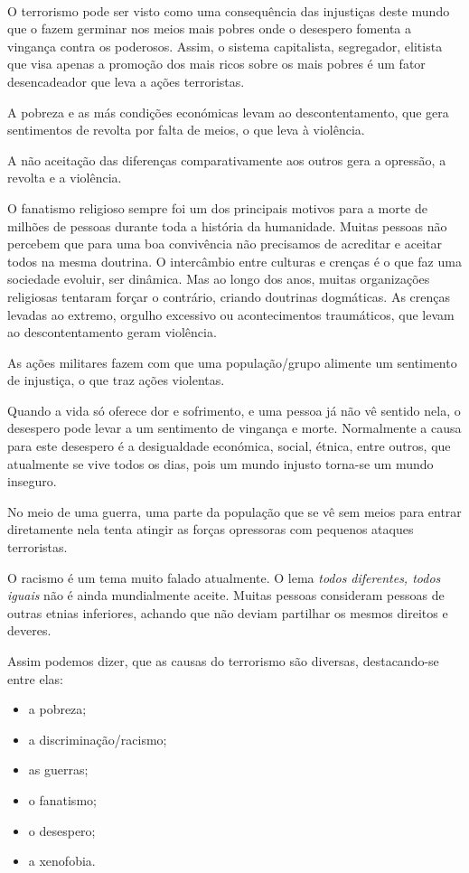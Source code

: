 \documentclass{report}
\begin{document}
\paragraph{} O terrorismo pode ser visto como uma consequência das injustiças deste mundo que o fazem germinar nos meios mais pobres onde o desespero fomenta a vingança contra os poderosos. Assim, o sistema capitalista, segregador, elitista que visa apenas a promoção dos mais ricos sobre os mais pobres é um fator desencadeador que leva a ações terroristas. \par
A pobreza e as más condições económicas levam ao descontentamento, que gera sentimentos de revolta por falta de meios, o que leva à violência. \par
A não aceitação das diferenças comparativamente aos outros gera a opressão, a revolta e a violência.\par
O fanatismo religioso sempre foi um dos principais motivos para a morte de milhões de pessoas durante toda a história da humanidade. Muitas pessoas não percebem que para uma boa convivência não precisamos de acreditar e aceitar todos na mesma doutrina. O intercâmbio entre culturas e crenças é o que faz uma sociedade evoluir, ser dinâmica. Mas ao longo dos anos, muitas organizações religiosas tentaram forçar o contrário, criando doutrinas dogmáticas. As crenças levadas ao extremo, orgulho excessivo ou acontecimentos traumáticos, que levam ao descontentamento geram violência. \par
As ações militares fazem com que uma população/grupo alimente um sentimento de injustiça, o que traz ações violentas.\par
Quando a vida só oferece dor e sofrimento, e uma pessoa já não vê sentido nela, o desespero pode levar a um sentimento de vingança e morte. Normalmente a causa para este desespero é a desigualdade económica, social, étnica, entre outros, que atualmente se vive todos os dias, pois um mundo injusto torna-se um mundo inseguro.\par
No meio de uma guerra, uma parte da população que se vê sem meios para entrar diretamente nela tenta atingir as forças opressoras com pequenos ataques terroristas.\par
O racismo é um tema muito falado atualmente. O lema \textit {todos diferentes, todos iguais} não é ainda mundialmente aceite. Muitas pessoas consideram pessoas de outras etnias inferiores, achando que não deviam partilhar os mesmos direitos e deveres.\par
Assim podemos dizer, que as causas do terrorismo são diversas, destacando-se entre elas:
\begin{itemize}
 \item a pobreza;
 \item a discriminação/racismo;
 \item as guerras;
 \item o fanatismo;
 \item o desespero;
 \item a xenofobia. 
\end{itemize}
\end{document}
